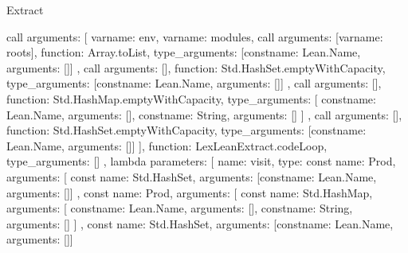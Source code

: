 \begin{lexlean}{Extract}
\begin{toolingmodule}
{{{{{{{                      call{
                        arguments: [
                          var{name: env},
                          var{name: modules},
                          call{
                            arguments: [var{name: roots}],
                            function: Array.toList,
                            type_arguments: [const{name: Lean.Name, arguments: []}]
                          },
                          call{
                            arguments: [],
                            function: Std.HashSet.emptyWithCapacity,
                            type_arguments: [const{name: Lean.Name, arguments: []}]
                          },
                          call{
                            arguments: [],
                            function: Std.HashMap.emptyWithCapacity,
                            type_arguments: [
                              const{name: Lean.Name, arguments: []},
                              const{name: String, arguments: []}
                            ]
                          },
                          call{
                            arguments: [],
                            function: Std.HashSet.emptyWithCapacity,
                            type_arguments: [const{name: Lean.Name, arguments: []}]
                          }
                        ],
                        function: LexLeanExtract.codeLoop,
                        type_arguments: []
                      },
                      lambda{
                        parameters: [
                          {
                            name: visit,
                            type: const{
                              name: Prod,
                              arguments: [
                                const{
                                  name: Std.HashSet,
                                  arguments: [const{name: Lean.Name, arguments: []}]
                                },
                                const{
                                  name: Prod,
                                  arguments: [
                                    const{
                                      name: Std.HashMap,
                                      arguments: [
                                        const{name: Lean.Name, arguments: []},
                                        const{name: String, arguments: []}
                                      ]
                                    },
                                    const{
                                      name: Std.HashSet,
                                      arguments: [const{name: Lean.Name, arguments: []}]
}}}}}}}}}}}}
\end{toolingmodule}
\end{lexlean}
